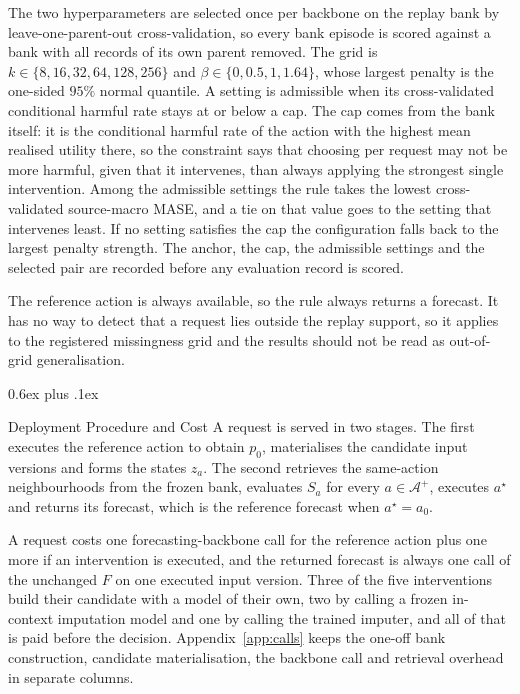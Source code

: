 \documentclass{article}
\makeatletter
\newcommand{\calA}{\mathcal{A}}
\def\subsection{\@startsection{subsection}{2}{\z@}{-1.4ex plus -0.4ex minus -.2ex}%
  {0.6ex plus .1ex}{\normalsize\sc\raggedright}}
\makeatother
\begin{document}
The two hyperparameters are selected once per backbone on the replay bank by
leave-one-parent-out cross-validation, so every bank episode is scored against a bank with all
records of its own parent removed. The grid is
$k \in \{8, 16, 32, 64, 128, 256\}$ and $\beta \in \{0, 0.5, 1, 1.64\}$, whose largest penalty
is the one-sided $95\%$ normal quantile. A setting is admissible when its cross-validated
conditional harmful rate stays at or below a cap. The cap comes from the bank itself: it is
the
conditional harmful rate of the action with the highest mean realised utility there, so the
constraint says that choosing per request may not be more harmful, given that it intervenes,
than always applying the strongest single intervention. Among the admissible settings the rule
takes the lowest cross-validated source-macro MASE, and a tie on that value goes to the setting
that intervenes least. If no setting satisfies the cap the configuration falls back to the
largest penalty strength. The anchor, the cap, the admissible settings and the selected pair
are recorded before any evaluation record is scored.

The reference action is always available, so the rule always returns a forecast. It has no way
to detect that a request lies outside the replay support, so it applies to the registered
missingness grid and the results should not be read as out-of-grid generalisation.

\subsection{Deployment Procedure and Cost}
\label{sec:method-deploy}
A request is served in two stages. The first executes the reference action to obtain $p_0$,
materialises the candidate input versions and forms the states $z_a$. The second retrieves the
same-action neighbourhoods from the frozen bank, evaluates $S_a$ for every $a \in \calA^{+}$,
executes $a^{\star}$ and returns its forecast, which is the reference forecast when
$a^{\star} = a_0$.

A request costs one forecasting-backbone call for the reference action plus one more if an
intervention is executed, and the returned forecast is always one call of the unchanged $F$ on
one executed input version. Three of the five interventions build their candidate with a model
of their own, two by calling a frozen in-context imputation model and one by calling the
trained imputer, and all of that is paid before the decision.
Appendix~\ref{app:calls} keeps the one-off bank construction, candidate materialisation, the
backbone call and retrieval overhead in separate columns.
\end{document}
